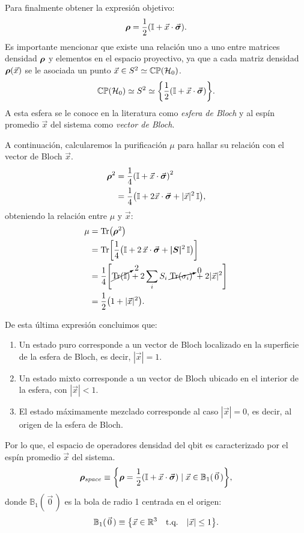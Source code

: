 \documentclass[../Main.tex]{subfiles}
\begin{document}
Para finalmente obtener la expresión objetivo:
\begin{equation}
    \bm{\rho} = \frac{1}{2}\qty(\mathbb{I}+\vec{x}\cdot\vec{\bm{\sigma}}).
\end{equation}
Es importante mencionar que existe una relación uno a uno entre matrices densidad $\bm{\rho}$ y elementos en el espacio proyectivo, ya que a cada matriz densidad $\bm{\rho}(\vec{x})$ se le asociada un punto $\vec{x}\in S^2 \simeq  \mathbb{CP}(\mathcal{H}_0)$.
\begin{equation}
    \mathbb{CP}(\mathcal{H}_0)\simeq     S^2\simeq\qty{\frac{1}{2}\qty(\mathbb{I}+ \vec{x}\cdot \vec{\bm{\sigma}})}.
\end{equation}
A esta esfera se le conoce en la literatura como \emph{esfera de Bloch} y al espín promedio $\vec{x}$ del sistema como \emph{vector de Bloch}.

A continuación, calcularemos la purificación $\mu$ para hallar su relación con el vector de Bloch $\vec{x}$.
\begin{align*}
    \bm{\rho}^2&=
    \frac{1}{4}\qty(\mathbb{I} + \vec{x}\cdot \vec{\bm{\sigma}})^2
    \notag \\
    &=\frac{1}{4}\qty(\mathbb{I}+2\vec{x}\cdot\vec{\bm{\sigma}}+|\vec{x}|^2\,\mathbb{I}),
\end{align*}
obteniendo la relación entre $\mu$ y $\vec{x}$:
\begin{align}
    \mu&=
    \Tr(\bm{\rho}^2)
    \notag\\
    &=\Tr[\frac{1}{4}\qty(\mathbb{I}+2\,\vec{x}\cdot\vec{\bm{\sigma}}+\bm{|S|}^2\,\mathbb{I})]
    \notag \\
    &= \frac{1}{4}\qty[\cancelto{2}{\Tr(\mathbb{I})}+2\sum_iS_i\;\cancelto{0}{\Tr(\sigma_i)}\;+2|\vec{x}|^2]
    \notag \\
    &=\frac{1}{2}\qty(1+|\vec{x}|^2).
\end{align}

De esta última expresión concluimos que:

\begin{enumerate}
    \item Un estado puro corresponde a un vector de Bloch localizado en la superficie de la esfera de Bloch, es decir, $|\vec{x}|=1$.
    \item Un estado mixto corresponde a un vector de Bloch ubicado en el interior de la esfera, con $|\vec{x}|<1$.
    \item El estado máximamente mezclado corresponde al caso $|\vec{x}|=0$, es decir, al origen de la esfera de Bloch.
\end{enumerate}

Por lo que, el espacio de operadores densidad del qbit es caracterizado por el espín promedio $\vec{x}$ del sistema.
\begin{equation}
    \bm{\rho}_{space}\equiv\qty{\bm{\rho}=\frac{1}{2}\qty(\mathbb{I}+ \vec{x}\cdot \vec{\bm{\sigma}})\;|\;\vec{x}\in \mathbb{B}_1(\,\vec{0}\,) },
    \label{eq:espacio_de_qbits}
\end{equation}
donde $\mathbb{B}_1(\,\vec{0}\,)$ es la bola de radio 1 centrada en el origen:
\begin{equation}
    \mathbb{B}_1(\,\vec{0}\,)\equiv \qty{\vec{x}\in \R^3 \qq{t.q.}\abs{\vec{x}}\leq1 }.
\end{equation}
\end{document}
